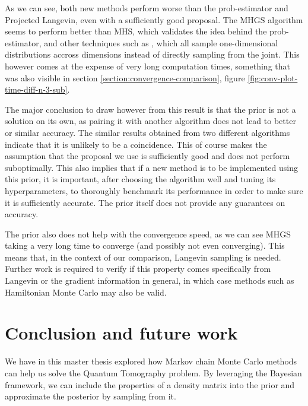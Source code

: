 \documentclass[12pt]{memoir}
\begin{document}
As we can see, both new methods perform worse than the prob-estimator and Projected Langevin, even with a sufficiently good proposal. The MHGS algorithm seems to perform better than MHS, which validates the idea behind the prob-estimator, and other techniques such as \cite{Mai22, LLJL20}, which all sample one-dimensional distributions accross dimensions instead of directly sampling from the joint. This however comes at the expense of very long computation times, something that was also visible in section \ref{section:convergence-comparison}, figure \ref{fig:conv-plot-time-diff-n-3-sub}.\medbreak

The major conclusion to draw however from this result is that the prior is not a solution on its own, as pairing it with another algorithm does not lead to better or similar accuracy. The similar results obtained from two different algorithms indicate that it is unlikely to be a coincidence. This of course makes the assumption that the proposal we use is sufficiently good and does not perform suboptimally. This also implies that if a new method is to be implemented using this prior, it is important, after choosing the algorithm well and tuning its hyperparameters, to thoroughly benchmark its performance in order to make sure it is sufficiently accurate. The prior itself does not provide any guarantees on accuracy.\medbreak

The prior also does not help with the convergence speed, as we can see MHGS taking a very long time to converge (and possibly not even converging). This means that, in the context of our comparison, Langevin sampling is needed. Further work is required to verify if this property comes specifically from Langevin or the gradient information in general, in which case methods such as Hamiltonian Monte Carlo may also be valid.

\chapter{Conclusion and future work}
We have in this master thesis explored how Markov chain Monte Carlo methods can help us solve the Quantum Tomography problem. By leveraging the Bayesian framework, we can include the properties of a density matrix into the prior and approximate the posterior by sampling from it.\medbreak
\end{document}
